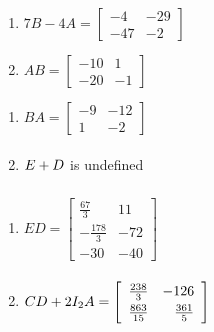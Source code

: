 \documentclass{ximera}
\begin{document}
\begin{multicols}{2} 
\begin{enumerate}
\setcounter{enumi}{\value{HW}}

\item $7B - 4A = \left[ \begin{array}{rr} -4 & -29 \\ -47 & -2 \end{array} \right]$
\item $AB = \left[ \begin{array}{rr} -10 & 1 \\ -20 & -1 \end{array} \right]$


\setcounter{HW}{\value{enumi}}
\end{enumerate}
\end{multicols}

\begin{multicols}{2} 
\begin{enumerate}
\setcounter{enumi}{\value{HW}}

\item $BA = \left[ \begin{array}{rr} -9 & -12 \\ 1 & -2 \end{array} \right]$
\item $E + D \vphantom{\left[ \begin{array}{rr} -9 & -12 \\ 1 & -2 \end{array} \right]}$ is undefined


\setcounter{HW}{\value{enumi}}
\end{enumerate}
\end{multicols}

\begin{multicols}{2} 
\begin{enumerate}
\setcounter{enumi}{\value{HW}}

\item $ED = \left[ \begin{array}{rr} \frac{67}{3}& 11 \\[3pt] -\frac{178}{3} & -72 \\ -30 & -40 \end{array} \right]$
\item $CD + 2I_{2}A = \left[ \begin{array}{rr} \frac{238}{3} & -126 \\[3pt] \frac{863}{15} & \frac{361}{5} \end{array} \right] \vphantom{\left[ \begin{array}{rr} \frac{67}{3}& 11 \\[3pt] -\frac{178}{3} & -72 \\ -30 & -40 \end{array} \right]}$


\setcounter{HW}{\value{enumi}}
\end{enumerate}
\end{multicols}
\end{document}
